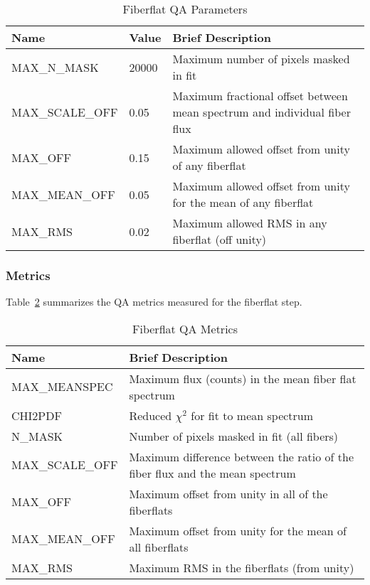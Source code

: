 \documentclass[12pt]{article}
\begin{document}
\begin{table}[h]
\begin{center}
\caption{Fiberflat QA Parameters}
\label{tab:flat_param}
\begin{tabular}{p{3.5cm}p{1.2cm}p{8.3cm}}
\hline
{\bf Name} & {\bf Value} & {\bf Brief Description}\\
\hline
MAX\_N\_MASK    & 20000 & Maximum number of pixels masked in fit \\
MAX\_SCALE\_OFF & 0.05  & Maximum fractional offset between mean spectrum and individual fiber flux \\ 
MAX\_OFF        & 0.15  & Maximum allowed offset from unity of any fiberflat \\
MAX\_MEAN\_OFF  & 0.05  & Maximum allowed offset from unity for the mean of any fiberflat \\
MAX\_RMS        & 0.02  & Maximum allowed RMS in any fiberflat (off unity) \\
\hline
\end{tabular}
\end{center}
\end{table}



\subsubsection{Metrics}

Table~\ref{tab:flat_metrics} summarizes the QA metrics measured
for the fiberflat step.  

\begin{table}[h]
\begin{center}
\caption{Fiberflat QA Metrics}
\label{tab:flat_metrics}
\begin{tabular}{p{3.5cm}p{9.0cm}}
\hline
{\bf Name} & {\bf Brief Description}\\
\hline
MAX\_MEANSPEC   & Maximum flux (counts) in the mean fiber flat spectrum \\ 
CHI2PDF         & Reduced $\chi^2$ for fit to mean spectrum \\
N\_MASK         & Number of pixels masked in fit (all fibers) \\
MAX\_SCALE\_OFF & Maximum difference between the ratio of the fiber flux and 
  the mean spectrum \\
MAX\_OFF        & Maximum offset from unity in all of the fiberflats \\
MAX\_MEAN\_OFF  & Maximum offset from unity for the mean of all fiberflats \\
MAX\_RMS        & Maximum RMS in the fiberflats (from unity) \\
\hline
\end{tabular}
\end{center}
\end{table}
\end{document}
